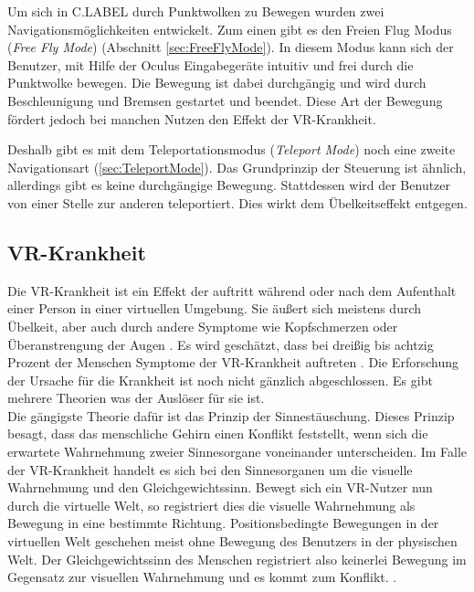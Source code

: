 Um sich in C.LABEL durch Punktwolken zu Bewegen wurden zwei Navigationsmöglichkeiten entwickelt. Zum einen gibt es den Freien Flug Modus (\textit{Free Fly Mode}) (Abschnitt \ref{sec:FreeFlyMode}). In diesem Modus kann sich der Benutzer, mit Hilfe der Oculus Eingabegeräte intuitiv und frei durch die Punktwolke bewegen. Die Bewegung ist dabei durchgängig und wird durch Beschleunigung und Bremsen gestartet und beendet. Diese Art der Bewegung fördert jedoch bei manchen Nutzen den Effekt der VR-Krankheit.

Deshalb gibt es mit dem Teleportationsmodus (\textit{Teleport Mode}) noch eine zweite Navigationsart (\ref{sec:TeleportMode}). Das Grundprinzip der Steuerung ist ähnlich, allerdings gibt es keine durchgängige Bewegung. Stattdessen wird der Benutzer von einer Stelle zur anderen teleportiert. Dies wirkt dem Übelkeitseffekt entgegen.   

\subsection{VR-Krankheit}
\label{sec:VRSickness}
Die VR-Krankheit ist ein Effekt der auftritt während oder nach dem Aufenthalt einer Person in einer virtuellen Umgebung. Sie äußert sich meistens durch Übelkeit, aber auch durch andere Symptome wie Kopfschmerzen oder Überanstrengung der Augen \cite{bib:VRSicknessLaviola}. Es wird geschätzt, dass bei dreißig bis achtzig Prozent der Menschen Symptome der VR-Krankheit auftreten \cite{bib:VRSicknessRebenitsch}. Die Erforschung der Ursache für die Krankheit ist noch nicht gänzlich abgeschlossen. Es gibt mehrere Theorien was der Auslöser für sie ist. \\

Die gängigste Theorie dafür ist das Prinzip der Sinnestäuschung. Dieses Prinzip besagt, dass das menschliche Gehirn einen Konflikt feststellt, wenn sich die erwartete Wahrnehmung zweier Sinnesorgane voneinander unterscheiden. Im Falle der VR-Krankheit handelt es sich bei den Sinnesorganen um die visuelle Wahrnehmung und den Gleichgewichtssinn. Bewegt sich ein VR-Nutzer nun durch die virtuelle Welt, so registriert dies die visuelle Wahrnehmung als Bewegung in eine bestimmte Richtung. Positionsbedingte Bewegungen in der virtuellen Welt geschehen meist ohne Bewegung des Benutzers in der physischen Welt. Der Gleichgewichtssinn des Menschen registriert also keinerlei Bewegung im Gegensatz zur visuellen Wahrnehmung und es kommt zum Konflikt. \cite{bib:VRSicknessKolanski}. \\

